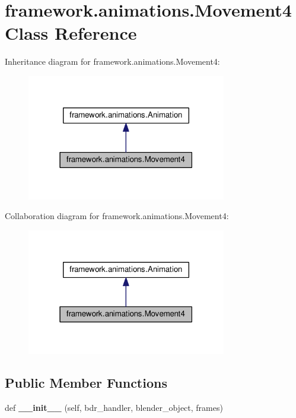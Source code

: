 \hypertarget{classframework_1_1animations_1_1Movement4}{}\section{framework.\+animations.\+Movement4 Class Reference}
\label{classframework_1_1animations_1_1Movement4}


Inheritance diagram for framework.\+animations.\+Movement4\+:
\nopagebreak
\begin{figure}[H]
\begin{center}
\leavevmode
\includegraphics[width=247pt]{classframework_1_1animations_1_1Movement4__inherit__graph}
\end{center}
\end{figure}


Collaboration diagram for framework.\+animations.\+Movement4\+:
\nopagebreak
\begin{figure}[H]
\begin{center}
\leavevmode
\includegraphics[width=247pt]{classframework_1_1animations_1_1Movement4__coll__graph}
\end{center}
\end{figure}
\subsection*{Public Member Functions}
\begin{DoxyCompactItemize}
\item 
def {\bfseries \+\_\+\+\_\+init\+\_\+\+\_\+} (self, bdr\+\_\+handler, blender\+\_\+object, frames)\hypertarget{classframework_1_1animations_1_1Movement4_a3f76014acac4b1078f20d08a91bc1260}{}\label{classframework_1_1animations_1_1Movement4_a3f76014acac4b1078f20d08a91bc1260}

\end{DoxyCompactItemize}
